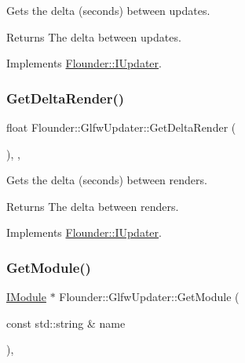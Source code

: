 Gets the delta (seconds) between updates. 

\begin{DoxyReturn}{Returns}
The delta between updates. 
\end{DoxyReturn}


Implements \hyperlink{class_flounder_1_1_i_updater_ac04f99c728fadd46ecaa219b2be358dc}{Flounder\+::\+I\+Updater}.

\mbox{\label{class_flounder_1_1_glfw_updater_ad93f3d6d4fde740f66339f5b894e5869}} 
\subsubsection{\texorpdfstring{Get\+Delta\+Render()}{GetDeltaRender()}}
{\footnotesize\ttfamily float Flounder\+::\+Glfw\+Updater\+::\+Get\+Delta\+Render (\begin{DoxyParamCaption}{ }\end{DoxyParamCaption})\hspace{0.3cm}{\ttfamily [inline]}, {\ttfamily [override]}, {\ttfamily [virtual]}}



Gets the delta (seconds) between renders. 

\begin{DoxyReturn}{Returns}
The delta between renders. 
\end{DoxyReturn}


Implements \hyperlink{class_flounder_1_1_i_updater_a62aed4c31b475fa7afc3a4d9863dca98}{Flounder\+::\+I\+Updater}.

\mbox{\label{class_flounder_1_1_glfw_updater_a7dbe6de40b5596a8f6501235645807ed}} 
\subsubsection{\texorpdfstring{Get\+Module()}{GetModule()}}
{\footnotesize\ttfamily \hyperlink{class_flounder_1_1_i_module}{I\+Module} $\ast$ Flounder\+::\+Glfw\+Updater\+::\+Get\+Module (\begin{DoxyParamCaption}\item[{const std\+::string \&}]{name }\end{DoxyParamCaption})\hspace{0.3cm}{\ttfamily [override]}, {\ttfamily [virtual]}}



